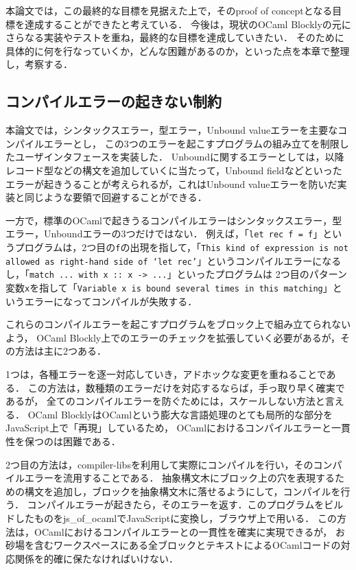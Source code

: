 本論文では，この最終的な目標を見据えた上で，そのproof of conceptとなる目標を達成することができたと考えている．
今後は，現状のOCaml Blocklyの元にさらなる実装やテストを重ね，最終的な目標を達成していきたい．
そのために具体的に何を行なっていくか，どんな困難があるのか，といった点を本章で整理し，考察する．

\subsection*{コンパイルエラーの起きない制約}

本論文では，シンタックスエラー，型エラー，Unbound valueエラーを主要なコンパイルエラーとし，
この3つのエラーを起こすプログラムの組み立てを制限したユーザインタフェースを実装した．
Unboundに関するエラーとしては，以降レコード型などの構文を追加していくに当たって，Unbound fieldなどといったエラーが起きうることが考えられるが，これはUnbound valueエラーを防いだ実装と同じような要領で回避することができる．

一方で，標準のOCamlで起きうるコンパイルエラーはシンタックスエラー，型エラー，Unboundエラーの3つだけではない．
例えば，「{\tt let rec f = f}」というプログラムは，2つ目の{\tt f}の出現を指して，「{\tt This kind of expression is not allowed as right-hand side of `let rec'}」というコンパイルエラーになるし，「{\tt match ... with x ::\ x -> ...}」といったプログラムは
2つ目のパターン変数{\tt x}を指して「{\tt Variable x is bound several times in this matching}」というエラーになってコンパイルが失敗する．

これらのコンパイルエラーを起こすプログラムをブロック上で組み立てられないよう，
OCaml Blockly上でのエラーのチェックを拡張していく必要があるが，その方法は主に2つある．

1つは，各種エラーを逐一対応していき，アドホックな変更を重ねることである．
この方法は，数種類のエラーだけを対応するならば，手っ取り早く確実であるが，
全てのコンパイルエラーを防ぐためには，スケールしない方法と言える．
OCaml BlocklyはOCamlという膨大な言語処理のとても局所的な部分をJavaScript上で「再現」しているため，
OCamlにおけるコンパイルエラーと一貫性を保つのは困難である．

2つ目の方法は，compiler-libsを利用して実際にコンパイルを行い，そのコンパイルエラーを流用することである．
抽象構文木にブロック上の穴を表現するための構文を追加し，ブロックを抽象構文木に落せるようにして，コンパイルを行う．
コンパイルエラーが起きたら，そのエラーを返す．このプログラムをビルドしたものをjs\_of\_ocamlでJavaScriptに変換し，ブラウザ上で用いる．
この方法は，OCamlにおけるコンパイルエラーとの一貫性を確実に実現できるが，
お砂場を含むワークスペースにある全ブロックとテキストによるOCamlコードの対応関係を的確に保たなければいけない．

